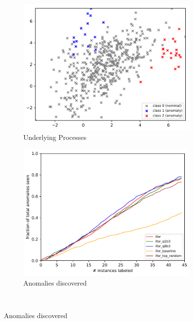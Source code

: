 \documentclass{article} %
\begin{document}
\begin{figure}
	\centering
	\begin{subfigure}[b]{0.48\textwidth}
		\includegraphics[width=\textwidth]{toy2_processes}
		\caption{Underlying Processes}
		\label{fig:processes}
	\end{subfigure}
	\begin{subfigure}[b]{0.48\textwidth}
		\includegraphics[width=\textwidth]{results_anoms_found_toy2}
		\caption{Anomalies discovered}
		\label{fig:discovery}
	\end{subfigure} \\

\end{figure}
\end{document}
